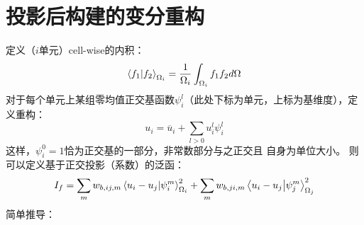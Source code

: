 \documentclass[UTF8,zihao=5]{ctexart} %
\newcommand*{\mean}[1]{\overline{#1}}
\begin{document}
\section{投影后构建的变分重构}

定义（$i$单元）cell-wise的内积：
$$
    \innerproduct{f_1}{f_2}_{\Omega_i}=\frac{1}{\Omega_i}\int_{\Omega_i}{f_1f_2d\Omega}
$$
对于每个单元上某组零均值正交基函数$\psi_i^l$（此处下标为单元，上标为基维度），定义重构：
$$
    u_i=\mean{u}_i + \sum_{l>0}{u_i^l\psi_i^l}
$$
这样，$\psi_i^0=1$恰为正交基的一部分，非常数部分与之正交且
自身为单位大小。
则可以定义基于正交投影（系数）的泛函：
$$
    I_f=
    \sum_{m}
    {
        w_{b,ij,m}
        \innerproduct{u_i-u_j}{\psi_i^m}_{\Omega_i}^2
    }
    +
    \sum_{m}
    {
        w_{b,ji,m}
        \innerproduct{u_i-u_j}{\psi_j^m}_{\Omega_j}^2
    }
$$
简单推导：
\end{document}
